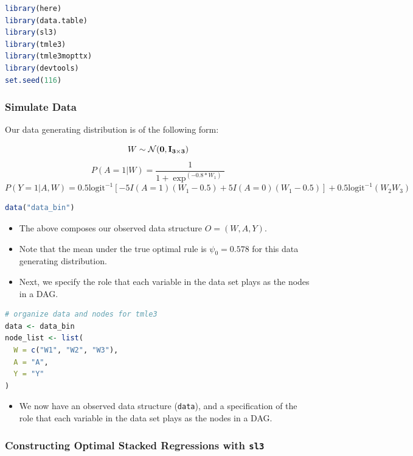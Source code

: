 \documentclass[
  12pt, krantz2,
]{book}
\newcommand{\passthrough}[1]{#1}
\providecommand{\tightlist}{%
  \setlength{\itemsep}{0pt}\setlength{\parskip}{0pt}}
\theoremstyle{definition}
\theoremstyle{definition}
\theoremstyle{definition}
\newcommand{\1}{\mathbbm{1}}
\begin{document}
\begin{lstlisting}[language=R]
library(here)
library(data.table)
library(sl3)
library(tmle3)
library(tmle3mopttx)
library(devtools)
set.seed(116)
\end{lstlisting}

\hypertarget{simulate-data}{%
\subsubsection{Simulate Data}\label{simulate-data}}

Our data generating distribution is of the following form:

\[W \sim \mathcal{N}(\bf{0},I_{3 \times 3})\]
\[P(A=1|W) = \frac{1}{1+\exp^{(-0.8*W_1)}}\]
\[P(Y=1|A,W) = 0.5\text{logit}^{-1}[-5I(A=1)(W_1-0.5)+5I(A=0)(W_1-0.5)] +
0.5\text{logit}^{-1}(W_2W_3)\]

\begin{lstlisting}[language=R]
data("data_bin")
\end{lstlisting}

\begin{itemize}
\item
  The above composes our observed data structure \(O = (W, A, Y)\).
\item
  Note that the mean under the true optimal rule is \(\psi_0=0.578\) for this data
  generating distribution.
\item
  Next, we specify the role that each variable in the data set plays as the
  nodes in a DAG.
\end{itemize}

\begin{lstlisting}[language=R]
# organize data and nodes for tmle3
data <- data_bin
node_list <- list(
  W = c("W1", "W2", "W3"),
  A = "A",
  Y = "Y"
)
\end{lstlisting}

\begin{itemize}
\tightlist
\item
  We now have an observed data structure (\passthrough{\lstinline!data!}), and a specification of the
  role that each variable in the data set plays as the nodes in a DAG.
\end{itemize}

\hypertarget{constructing-optimal-stacked-regressions-with-sl3}{%
\subsubsection{\texorpdfstring{Constructing Optimal Stacked Regressions with \texttt{sl3}}{Constructing Optimal Stacked Regressions with sl3}}\label{constructing-optimal-stacked-regressions-with-sl3}}
\end{document}
